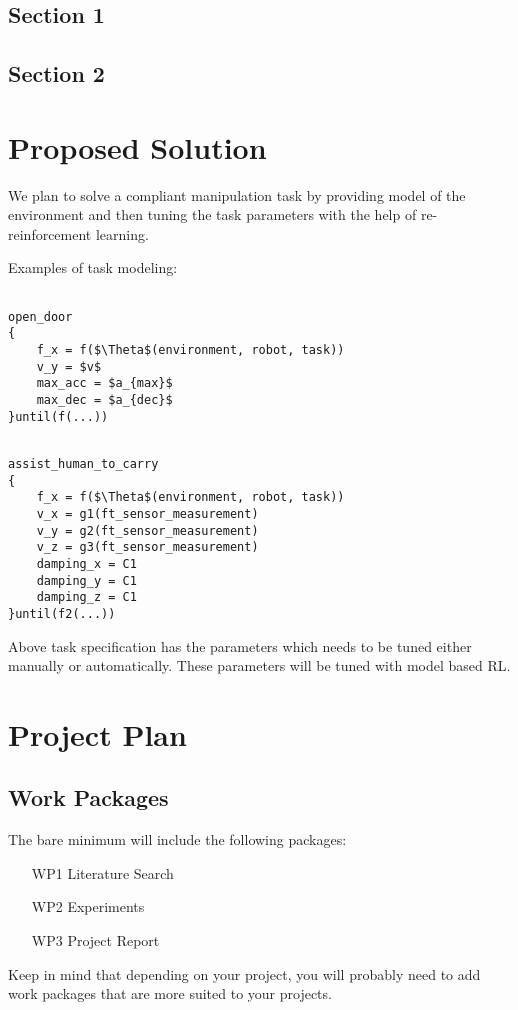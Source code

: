 \documentclass[thesis]{mas_proposal}
\begin{document}
\section{Section 1}
\section{Section 2}

\chapter{Proposed Solution}

We plan to solve a compliant manipulation task by providing model of the environment and then tuning the task parameters with the help of re-reinforcement learning.

Examples of task modeling: 

\begin{lstlisting}

open_door
{
	f_x = f($\Theta$(environment, robot, task))
	v_y = $v$
	max_acc = $a_{max}$
	max_dec = $a_{dec}$
}until(f(...))

\end{lstlisting}


\begin{lstlisting}

assist_human_to_carry
{
	f_x = f($\Theta$(environment, robot, task))
	v_x = g1(ft_sensor_measurement)
	v_y = g2(ft_sensor_measurement)
	v_z = g3(ft_sensor_measurement)
	damping_x = C1
	damping_y = C1
	damping_z = C1
}until(f2(...))

\end{lstlisting}

Above task specification has the parameters which needs to be tuned either manually or automatically. These parameters will be tuned with model based RL.

\chapter{Project Plan}

\section{Work Packages}
The bare minimum will include the following packages:
\begin{enumerate}
    \item[WP1] Literature Search
    \item[WP2] Experiments
    \item[WP3] Project Report
\end{enumerate}
Keep in mind that depending on your project, you will probably need to add work packages that are more suited to your projects.
\end{document}
